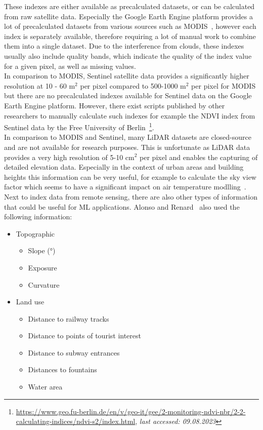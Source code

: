 These indexes are either available as precalculated datasets, or can be calculated from raw satellite data. Especially the Google Earth Engine platform provides a lot of precalculated datasets from various sources such as MODIS~\cite{didan2021modis}, however each index is separately available, therefore requiring a lot of manual work to combine them into a single dataset. Due to the interference from clouds, these indexes usually also include quality bands, which indicate the quality of the index value for a given pixel, as well as missing values.\\
In comparison to MODIS, Sentinel satellite data provides a significantly higher resolution at 10 - 60 m$^2$ per pixel compared to 500-1000 m$^2$ per pixel for MODIS but there are no precalculated indexes available for Sentinel data on the Google Earth Engine platform. However, there exist scripts published by other researchers to manually calculate such indexes for example the NDVI index from Sentinel data by the Free University of Berlin~\footnote{\url{https://www.geo.fu-berlin.de/en/v/geo-it/gee/2-monitoring-ndvi-nbr/2-2-calculating-indices/ndvi-s2/index.html}, \textit{last accessed: 09.08.2023}}.\\
In comparison to MODIS and Sentinel, many LiDAR datasets are closed-source and are not available for research purposes. This is unfortunate as LiDAR data provides a very high resolution of 5-10 cm$^2$ per pixel and enables the capturing of detailed elevation data. Especially in the context of urban areas and building heights this information can be very useful, for example to calculate the sky view factor which seems to have a significant impact on air temperature modlling~\cite{dirksen2019sky}.\\
Next to index data from remote sensing, there are also other types of information that could be useful for ML applications. Alonso and Renard~\cite{alonso2020new} also used the following information:

\begin{itemize}
    \item Topographic

    \begin{itemize}
        \item Slope (°)
        \item Exposure
        \item Curvature
    \end{itemize}
    \item Land use

    \begin{itemize}
        \item Distance to railway tracks
        \item Distance to points of tourist interest
        \item Distance to subway entrances
        \item Distances to fountains
        \item Water area
    \end{itemize}
\end{itemize}

